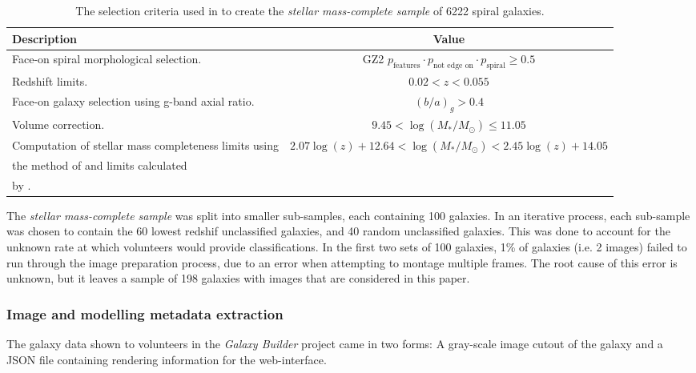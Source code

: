 \documentclass[../main.tex]{subfiles}
\begin{document}
\begin{table*}
  \centering
  \caption{The selection criteria used in \citet{2017MNRAS.472.2263H} to create the \textit{stellar mass-complete sample} of 6222 spiral galaxies.}
  \begin{tabular}{ |l|c| }
    \hline
    Description & Value\\
    \hline
    Face-on spiral morphological selection. & GZ2 $p_\text{features} \cdot p_\text{not edge on} \cdot p_\text{spiral} \ge 0.5$ \\
    Redshift limits. & $0.02 < z < 0.055$ \\
    Face-on galaxy selection using g-band axial ratio. & $(b/a)_g > 0.4$ \\
    Volume correction. & $9.45 < \log(M_* / M_\odot) \le 11.05$ \\
    Computation of stellar mass completeness limits using & $2.07\log(z) + 12.64 < \log({M_* / M_\odot}) < 2.45\log(z) + 14.05$ \\
    the method of \citet{Pozzetti2009:0907.5416v2} and limits calculated & \\
    by \citet{2017MNRAS.472.2263H}. & \\
    \hline
  \end{tabular}
  \label{table:sample_selection}
\end{table*}

The \textit{stellar mass-complete sample} was split into smaller sub-samples, each containing 100 galaxies. In an iterative process, each sub-sample was chosen to contain the 60 lowest redshif unclassified galaxies, and 40 random unclassified galaxies. This was done to account for the unknown rate at which volunteers would provide classifications. In the first two sets of 100 galaxies, 1\% of galaxies (i.e. 2 images) failed to run through the image preparation process, due to an error when attempting to montage multiple frames. The root cause of this error is unknown, but it leaves a sample of 198 galaxies with images that are considered in this paper.

\subsubsection{Image and modelling metadata extraction}
\label{sec:image_creation}

The galaxy data shown to volunteers in the \textit{Galaxy Builder} project came in two forms: A gray-scale image cutout of the galaxy and a JSON file containing rendering information for the web-interface.
\end{document}
